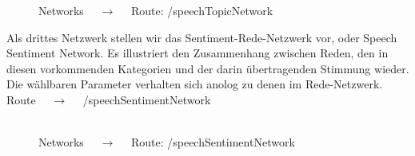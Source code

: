 \documentclass[10pt]{report}
\begin{document}
\begin{figure}[H]
	\begin{center}		
  	 \end{center}
	\caption{Networks  $\quad\rightarrow\quad$  Route:  /speechTopicNetwork}	
 \end{figure}

 
\noindent Als drittes Netzwerk stellen wir das Sentiment-Rede-Netzwerk vor, oder Speech Sentiment Network. 
Es illustriert den Zusammenhang zwischen Reden, den in diesen vorkommenden Kategorien und der darin übertragenden Stimmung wieder.
Die wählbaren Parameter verhalten sich anolog zu denen im Rede-Netzwerk.\\
Route $\quad\rightarrow\quad$  /speechSentimentNetwork\\\\ 
 
\begin{figure}[H]
	\begin{center}		
  	 \end{center}
	\caption{Networks  $\quad\rightarrow\quad$  Route:  /speechSentimentNetwork}	
 \end{figure}
\end{document}
